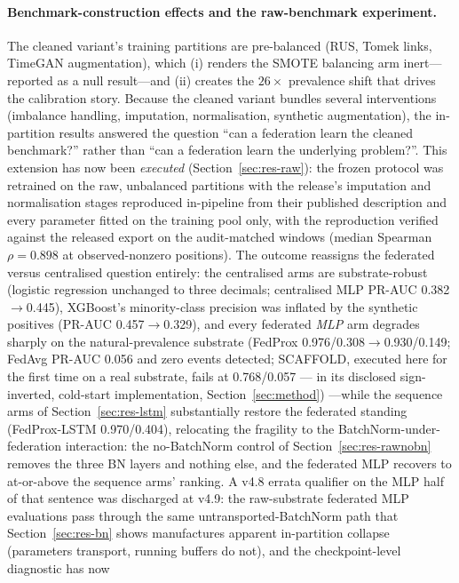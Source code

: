 \paragraph{Benchmark-construction effects and the raw-benchmark experiment.}
The cleaned variant's training partitions are pre-balanced (RUS,
Tomek links, TimeGAN augmentation), which (i) renders the SMOTE
balancing arm inert---reported as a null result---and (ii) creates
the $26\times$ prevalence shift that drives the calibration story.
Because the cleaned variant bundles several interventions (imbalance
handling, imputation, normalisation, synthetic augmentation), the
in-partition results answered the question ``can a federation learn
the cleaned benchmark?'' rather than ``can a federation learn the
underlying problem?''. This extension has now been \emph{executed}
(Section~\ref{sec:res-raw}): the frozen protocol was retrained on the
raw, unbalanced partitions with the release's imputation and
normalisation stages reproduced in-pipeline from their published
description and every parameter fitted on the training pool only,
with the reproduction verified against the released export on the
audit-matched windows (median Spearman $\rho=0.898$ at
observed-nonzero positions). The outcome reassigns the federated
versus centralised question entirely: the centralised arms are
substrate-robust (logistic regression unchanged to three decimals;
centralised MLP PR-AUC 0.382$\to$0.445), XGBoost's minority-class
precision was inflated by the synthetic positives (PR-AUC
0.457$\to$0.329), and every federated \emph{MLP} arm degrades sharply
on the natural-prevalence substrate (FedProx 0.976/0.308$\to$0.930/0.149;
FedAvg PR-AUC 0.056 and zero events detected; SCAFFOLD, executed
here for the first time on a real substrate, fails at 0.768/0.057 ---
in its disclosed sign-inverted, cold-start implementation,
Section~\ref{sec:method})
---while the sequence arms of Section~\ref{sec:res-lstm}
substantially restore the federated standing (FedProx-LSTM
0.970/0.404), relocating the fragility to the
BatchNorm-under-federation interaction: the no-BatchNorm control of
Section~\ref{sec:res-rawnobn} removes the three BN layers and nothing
else, and the federated MLP recovers to at-or-above the sequence
arms' ranking. A v4.8 errata qualifier on
the MLP half of that sentence was discharged at v4.9: the raw-substrate
federated MLP evaluations pass through the same
untransported-BatchNorm path that Section~\ref{sec:res-bn} shows
manufactures apparent in-partition collapse (parameters transport,
running buffers do not), and the checkpoint-level diagnostic has now
